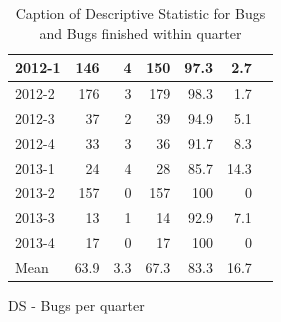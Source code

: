 \documentclass[UKenglish]{ifimaster}  %
\begin{document}
\begin{appendices}
\begin{table}[!htbp]
\begin{adjustwidth}{-1.5cm}{}
\begin{subfigure}[b]{0.3\textwidth}
{\begin{tabular}{ | l | r | r | r | r | r | r | }
2012-1 & 146 & 4 & 150 & 97.3 & 2.7 \\ \hline
2012-2 & 176 & 3 & 179 & 98.3& 1.7 \\ \hline
2012-3 & 37 & 2 & 39 & 94.9& 5.1\\ \hline
2012-4 & 33 & 3 & 36 & 91.7 & 8.3 \\ \hline
2013-1 & 24 & 4 & 28 & 85.7 & 14.3 \\ \hline
2013-2 & 157 & 0 & 157 & 100 & 0 \\ \hline
2013-3 & 13 & 1 & 14 & 92.9& 7.1 \\ \hline
2013-4 & 17 & 0 & 17 & 100 & 0 \\ \hline
Mean & 63.9&3.3&67.3&83.3&16.7\\ \hline
\end{tabular}
}
\caption{DS - Bugs per quarter}
\label{DS:FTPQ:1}
\end{subfigure}
\end{adjustwidth}
\caption[Optional caption for list of figures]{Caption of Descriptive Statistic for Bugs and Bugs finished within quarter}
\label{DS:1:5} %
\end{table}
 


 

\end{appendices}
\end{document}
